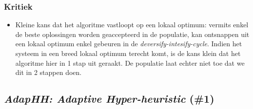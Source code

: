 \subsubsection{Kritiek}
\begin{itemize}
 \item Kleine kans dat het algoritme vastloopt op een lokaal optimum: vermits enkel de beste oplossingen worden geaccepteerd in de populatie, kan ontsnappen uit een lokaal optimum enkel gebeuren in de \emph{deversify-intesify-cycle}. Indien het systeem in een breed lokaal optimum terecht komt, is de kans klein dat het algoritme hier in 1 stap uit geraakt. De populatie laat echter niet toe dat we dit in 2 stappen doen.
\end{itemize}
\subsection{\emph{AdapHH: Adaptive Hyper-heuristic} (\#1)}
\label{sss:adaphh}
